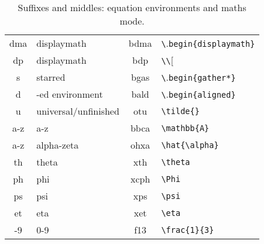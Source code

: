 \documentclass[11pt]{article}
\begin{document}
\begin{table}[htb]
\begin{center}
\begin{tabular}{>{\ttfamily}cl>{\ttfamily}c>{\ttfamily}l}
  dma& displaymath  & bdma{}  & \verb.\.\verb.begin{displaymath}. \\
  dp & displaymath  & bdp{}   & \verb.\\.[ \\
  s  & starred{}    & bgas{}  & \verb.\.\verb.begin{gather*}. \\
  d{}& -ed environment      & bald{} & \verb.\.\verb.begin{aligned}. \\
  u  & universal/unfinished & otu{}  & \verb.\tilde{}.\\
  a-z& a-z          & bbca{}  & \verb.\mathbb{A}. \\
  a-z& alpha-zeta   & ohxa{}  & \verb.\hat{\alpha}. \\
  th & theta        & xth{}   & \verb.\theta. \\
  ph & phi          & xcph{}  & \verb.\Phi. \\
  ps & psi          & xps{}   & \verb.\psi. \\
  et & eta          & xet{}   & \verb.\eta. \\
  0-9& 0-9          & f13{}   & \verb.\frac{1}{3}. \\
\bottomrule
  \end{tabular}
\end{center}
\caption{Suffixes and middles: equation environments and maths mode.}
\label{tb:suffeq}
\end{table}



\end{document}
